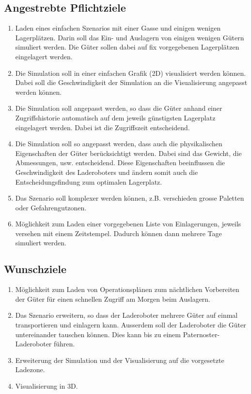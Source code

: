 \documentclass[11pt,a4paper]{article}
\begin{document}
\subsection{Angestrebte Pflichtziele}
\begin{enumerate}
  \item Laden eines einfachen Szenarios mit einer Gasse und einigen wenigen Lagerplätzen. Darin soll das Ein- und Auslagern von einigen wenigen Gütern simuliert werden. Die Güter sollen dabei auf fix vorgegebenen Lagerplätzen eingelagert werden.
  \item Die Simulation soll in einer einfachen Grafik (2D) visualisiert werden können. Dabei soll die Geschwindigkeit der Simulation an die Visualisierung angepasst werden können.
  \item Die Simulation soll angepasst werden, so dass die Güter anhand einer Zugriffshistorie automatisch auf dem jeweils günstigsten Lagerplatz eingelagert werden. Dabei ist die Zugriffszeit entscheidend.
  \item Die Simulation soll so angepasst werden, dass auch die physikalischen Eigenschaften der Güter berücksichtigt werden. Dabei sind das Gewicht, die Abmessungen, usw. entscheidend. Diese Eigenschaften beeinflussen die Geschwindigkeit des Laderoboters und ändern somit auch die Entscheidungsfindung zum optimalen Lagerplatz.
  \item Das Szenario soll komplexer werden können, z.B. verschieden grosse Paletten oder Gefahrengutzonen.
  \item Möglichkeit zum Laden einer vorgegebenen Liste von Einlagerungen, jeweils versehen mit einem Zeitstempel. Dadurch können dann mehrere Tage simuliert werden.
\end{enumerate}
%
\subsection{Wunschziele}
\begin{enumerate}
  \item Möglichkeit zum Laden von Operationsplänen zum nächtlichen Vorbereiten der Güter für einen schnellen Zugriff am Morgen beim Auslagern.
  \item Das Szenario erweitern, so dass der Laderoboter mehrere Güter auf einmal transportieren und einlagern kann. Ausserdem soll der Laderoboter die Güter untereinander tauschen können. Dies kann bis zu einem Paternoster-Laderoboter führen.
  \item Erweiterung der Simulation und der Visualisierung auf die vorgesetzte Ladezone.
  \item Visualisierung in 3D.
\end{enumerate}
%
\end{document}
